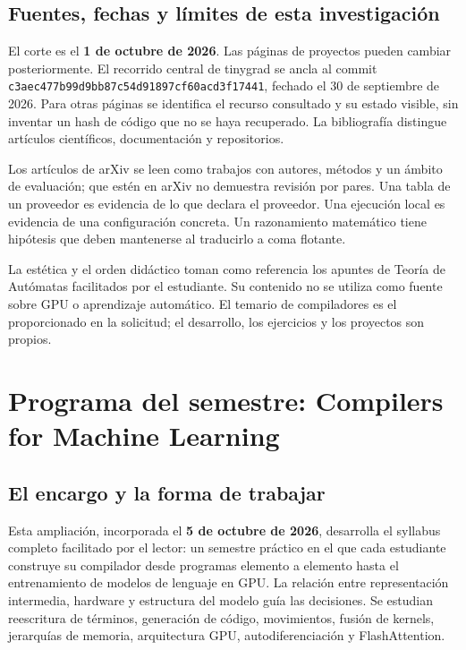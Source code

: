 \documentclass[12pt,a4paper,oneside]{report}
\begin{document}
\section{Fuentes, fechas y límites de esta investigación}
El corte es el \textbf{1 de octubre de 2026}. Las páginas de proyectos pueden cambiar posteriormente. El recorrido central de tinygrad se ancla al commit \texttt{c3aec477b99d\allowbreak{}9bb87c54d918\allowbreak{}97cf60acd3f1\allowbreak{}7441}, fechado el 30 de septiembre de 2026. Para otras páginas se identifica el recurso consultado y su estado visible, sin inventar un hash de código que no se haya recuperado. La bibliografía distingue artículos científicos, documentación y repositorios. \cite{tinygrad-pin}

Los artículos de arXiv se leen como trabajos con autores, métodos y un ámbito de evaluación; que estén en arXiv no demuestra revisión por pares. Una tabla de un proveedor es evidencia de lo que declara el proveedor. Una ejecución local es evidencia de una configuración concreta. Un razonamiento matemático tiene hipótesis que deben mantenerse al traducirlo a coma flotante.

La estética y el orden didáctico toman como referencia los apuntes de Teoría de Autómatas facilitados por el estudiante. Su contenido no se utiliza como fuente sobre GPU o aprendizaje automático. El temario de compiladores es el proporcionado en la solicitud; el desarrollo, los ejercicios y los proyectos son propios.


\chapter*{Programa del semestre: Compilers for Machine Learning}
\label{curso:programa}
\section{El encargo y la forma de trabajar}
Esta ampliación, incorporada el \textbf{5 de octubre de 2026}, desarrolla el syllabus completo facilitado por el lector: un semestre práctico en el que cada estudiante construye su compilador desde programas elemento a elemento hasta el entrenamiento de modelos de lenguaje en GPU. La relación entre representación intermedia, hardware y estructura del modelo guía las decisiones. Se estudian reescritura de términos, generación de código, movimientos, fusión de kernels, jerarquías de memoria, arquitectura GPU, autodiferenciación y FlashAttention.
\end{document}
